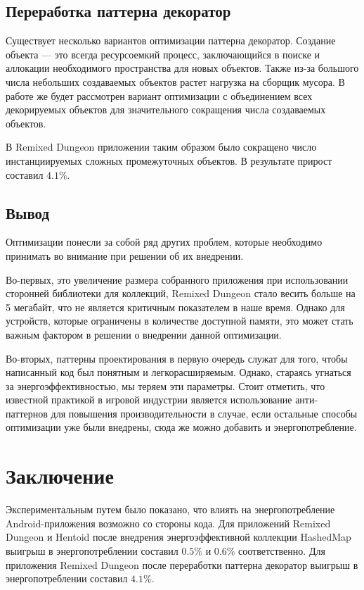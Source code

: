 \documentclass{math-mech-sci}
\begin{document}
    \subsection{Переработка паттерна декоратор}
        Существует несколько вариантов оптимизации паттерна декоратор. Создание объекта — это всегда ресурсоемкий процесс, заключающийся в поиске и аллокации необходимого пространства для новых объектов. Также из-за большого числа небольших создаваемых объектов растет нагрузка на сборщик мусора. В работе же будет рассмотрен вариант оптимизации с объединением всех декорируемых объектов для значительного сокращения числа создаваемых объектов.

        В Remixed Dungeon приложении таким образом было сокращено число инстанциируемых сложных промежуточных объектов. В результате прирост составил $4.1\%$.

    \subsection{Вывод}
        Оптимизации понесли за собой ряд других проблем, которые необходимо принимать во внимание при решении об их внедрении.
        
        Во-первых, это увеличение размера собранного приложения при использовании сторонней библиотеки для коллекций, Remixed Dungeon стало весить больше на 5 мегабайт, что не является критичным показателем в наше время. Однако для устройств, которые ограничены в количестве доступной памяти, это может стать важным фактором в решении о внедрении данной оптимизации.

        Во-вторых, паттерны проектирования в первую очередь служат для того, чтобы написанный код был понятным и легкорасширяемым. Однако, стараясь угнаться за энергоэффективностью, мы теряем эти параметры. Стоит отметить, что известной практикой в игровой индустрии является использование анти-паттернов для повышения производительности в случае, если остальные способы оптимизации уже были внедрены, сюда же можно добавить и энергопотребление.

\section{Заключение}
    Экспериментальным путем было показано, что влиять на энергопотребление Android-приложения возможно со стороны кода. Для приложений Remixed Dungeon и Hentoid после внедрения энергоэффективной коллекции HashedMap выигрыш в энергопотреблении составил $0.5\%$ и $0.6\%$ соответственно. Для приложения Remixed Dungeon после переработки паттерна декоратор выигрыш в энергопотреблении составил $4.1\%$.
\end{document}
